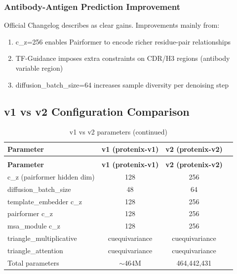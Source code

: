 \documentclass[12pt,a4paper]{article}
\begin{document}
\subsubsection{Antibody-Antigen Prediction Improvement}

Official Changelog describes as clear gains. Improvements mainly from:
\begin{enumerate}
    \item c_z=256 enables Pairformer to encode richer residue-pair relationships
    \item TF-Guidance imposes extra constraints on CDR/H3 regions (antibody variable region)
    \item diffusion_batch_size=64 increases sample diversity per denoising step
\end{enumerate}

\subsection{v1 vs v2 Configuration Comparison}

\begin{longtable}{lccc}
    \caption{v1 vs v2 Key Configuration Parameters} \\
    \toprule
    \textbf{Parameter} & \textbf{v1 (protenix-v1)} & \textbf{v2 (protenix-v2)} \\
    \midrule
    \endfirsthead
    \caption[]{v1 vs v2 parameters (continued)} \\
    \toprule
    \textbf{Parameter} & \textbf{v1 (protenix-v1)} & \textbf{v2 (protenix-v2)} \\
    \midrule
    \endhead
    \bottomrule
    \endfoot
    \endlastfoot

    c_z (pairformer hidden dim) & 128 & 256 \\
    diffusion_batch_size & 48 & 64 \\
    template_embedder c_z & 128 & 256 \\
    pairformer c_z & 128 & 256 \\
    msa_module c_z & 128 & 256 \\
    triangle_multiplicative & cuequivariance & cuequivariance \\
    triangle_attention & cuequivariance & cuequivariance \\
    Total parameters & $\sim$464M & 464,442,431 \\
\end{longtable}

\clearpage
\end{document}
